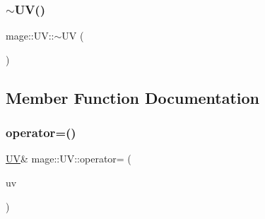 \hypertarget{structmage_1_1_u_v_a9389be8cc9bb64861b69f79b44b6dd1b}{}\label{structmage_1_1_u_v_a9389be8cc9bb64861b69f79b44b6dd1b} 
\subsubsection{\texorpdfstring{$\sim$\+U\+V()}{~UV()}}
{\footnotesize\ttfamily mage\+::\+U\+V\+::$\sim$\+UV (\begin{DoxyParamCaption}{ }\end{DoxyParamCaption})\hspace{0.3cm}{\ttfamily [default]}}



\subsection{Member Function Documentation}
\hypertarget{structmage_1_1_u_v_abb607259f1710f1344f83ebc21a1a5da}{}\label{structmage_1_1_u_v_abb607259f1710f1344f83ebc21a1a5da} 
\subsubsection{\texorpdfstring{operator=()}{operator=()}}
{\footnotesize\ttfamily \hyperlink{structmage_1_1_u_v}{UV}\& mage\+::\+U\+V\+::operator= (\begin{DoxyParamCaption}\item[{const \hyperlink{structmage_1_1_u_v}{UV} \&}]{uv }\end{DoxyParamCaption})}

